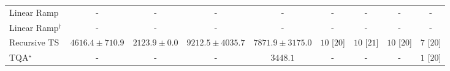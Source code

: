 \begin{tabular}{l|cccc|cccc|}
Linear Ramp & {\cellcolor[HTML]{000000}} \color[HTML]{F1F1F1} {\cellcolor{white}} \color{black} - & {\cellcolor[HTML]{000000}} \color[HTML]{F1F1F1} {\cellcolor{white}} \color{black} - & {\cellcolor[HTML]{000000}} \color[HTML]{F1F1F1} {\cellcolor{white}} \color{black} - & {\cellcolor[HTML]{000000}} \color[HTML]{F1F1F1} {\cellcolor{white}} \color{black} - & {\cellcolor[HTML]{000000}} \color[HTML]{F1F1F1} {\cellcolor{white}} \color{black} - & {\cellcolor[HTML]{000000}} \color[HTML]{F1F1F1} {\cellcolor{white}} \color{black} - & {\cellcolor[HTML]{000000}} \color[HTML]{F1F1F1} {\cellcolor{white}} \color{black} - & {\cellcolor[HTML]{000000}} \color[HTML]{F1F1F1} {\cellcolor{white}} \color{black} - \\
Linear Ramp$^\dagger$ & {\cellcolor[HTML]{000000}} \color[HTML]{F1F1F1} {\cellcolor{white}} \color{black} - & {\cellcolor[HTML]{000000}} \color[HTML]{F1F1F1} {\cellcolor{white}} \color{black} - & {\cellcolor[HTML]{000000}} \color[HTML]{F1F1F1} {\cellcolor{white}} \color{black} - & {\cellcolor[HTML]{000000}} \color[HTML]{F1F1F1} {\cellcolor{white}} \color{black} - & {\cellcolor[HTML]{000000}} \color[HTML]{F1F1F1} {\cellcolor{white}} \color{black} - & {\cellcolor[HTML]{000000}} \color[HTML]{F1F1F1} {\cellcolor{white}} \color{black} - & {\cellcolor[HTML]{000000}} \color[HTML]{F1F1F1} {\cellcolor{white}} \color{black} - & {\cellcolor[HTML]{000000}} \color[HTML]{F1F1F1} {\cellcolor{white}} \color{black} - \\
Recursive TS & {\cellcolor[HTML]{9CB9D9}} \color[HTML]{000000} $4616.4\pm 710.9$ & {\cellcolor[HTML]{F4EDF6}} \color[HTML]{000000} $2123.9\pm 0.0$ & {\cellcolor[HTML]{023858}} \color[HTML]{F1F1F1} $9212.5\pm 4035.7$ & {\cellcolor[HTML]{04629A}} \color[HTML]{F1F1F1} $7871.9\pm 3175.0$ & {\cellcolor[HTML]{49006A}} \color[HTML]{F1F1F1} $10$ [$20$] & {\cellcolor[HTML]{49006A}} \color[HTML]{F1F1F1} $10$ [$21$] & {\cellcolor[HTML]{49006A}} \color[HTML]{F1F1F1} $10$ [$20$] & {\cellcolor[HTML]{CD238F}} \color[HTML]{F1F1F1} $7$ [$20$] \\
TQA$^\star$ & {\cellcolor[HTML]{000000}} \color[HTML]{F1F1F1} {\cellcolor{white}} \color{black} - & {\cellcolor[HTML]{000000}} \color[HTML]{F1F1F1} {\cellcolor{white}} \color{black} - & {\cellcolor[HTML]{000000}} \color[HTML]{F1F1F1} {\cellcolor{white}} \color{black} - & {\cellcolor[HTML]{D1D2E6}} \color[HTML]{000000} $3448.1$ & {\cellcolor[HTML]{000000}} \color[HTML]{F1F1F1} {\cellcolor{white}} \color{black} - & {\cellcolor[HTML]{000000}} \color[HTML]{F1F1F1} {\cellcolor{white}} \color{black} - & {\cellcolor[HTML]{000000}} \color[HTML]{F1F1F1} {\cellcolor{white}} \color{black} - & {\cellcolor[HTML]{FFF7F3}} \color[HTML]{000000} $1$ [$20$] \\

\end{tabular}
